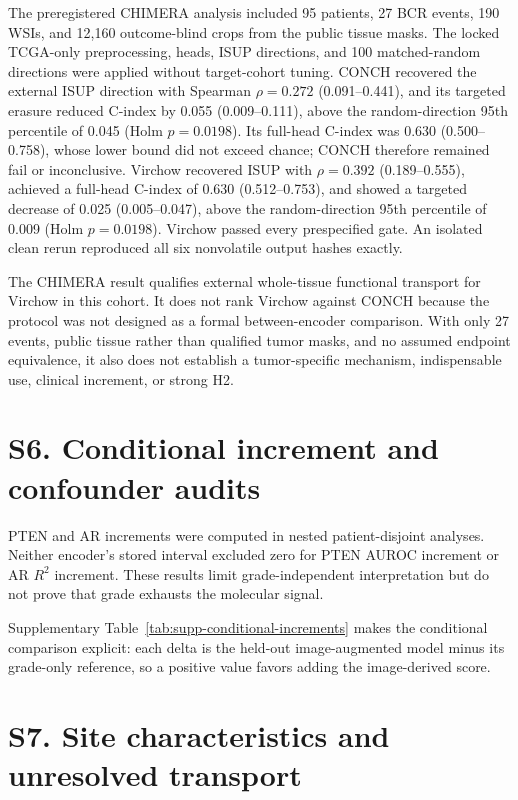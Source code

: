 The preregistered CHIMERA analysis included 95 patients, 27 BCR events, 190 WSIs, and 12,160
outcome-blind crops from the public tissue masks. The locked TCGA-only preprocessing, heads,
ISUP directions, and 100 matched-random directions were applied without target-cohort tuning.
CONCH recovered the external ISUP direction with Spearman $\rho=0.272$
(0.091--0.441), and its targeted erasure reduced C-index by 0.055 (0.009--0.111), above the
random-direction 95th percentile of 0.045 (Holm $p=0.0198$). Its full-head C-index was 0.630
(0.500--0.758), whose lower bound did not exceed chance; CONCH therefore remained fail or
inconclusive. Virchow recovered ISUP with $\rho=0.392$ (0.189--0.555), achieved a full-head
C-index of 0.630 (0.512--0.753), and showed a targeted decrease of 0.025 (0.005--0.047), above
the random-direction 95th percentile of 0.009 (Holm $p=0.0198$). Virchow passed every
prespecified gate. An isolated clean rerun reproduced all six nonvolatile output hashes exactly.

The CHIMERA result qualifies external whole-tissue functional transport for Virchow in this
cohort. It does not rank Virchow against CONCH because the protocol was not designed as a formal
between-encoder comparison. With only 27 events, public tissue rather than qualified tumor
masks, and no assumed endpoint equivalence, it also does not establish a tumor-specific
mechanism, indispensable use, clinical increment, or strong H2.



\section*{S6. Conditional increment and confounder audits}

PTEN and AR increments were computed in nested patient-disjoint analyses. Neither encoder's
stored interval excluded zero for PTEN AUROC increment or AR $R^2$ increment. These results
limit grade-independent interpretation but do not prove that grade exhausts the molecular
signal.

Supplementary Table~\ref{tab:supp-conditional-increments} makes the conditional comparison explicit:
each delta is the held-out image-augmented model minus its grade-only reference, so a
positive value favors adding the image-derived score.




\section*{S7. Site characteristics and unresolved transport}

